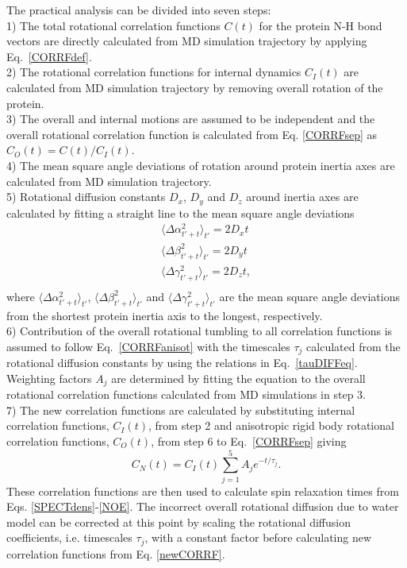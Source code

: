 \documentclass[journal=jpcbfk,manuscript=article]{achemso}
\begin{document}
The practical analysis can be divided into seven steps: \\
1) The total rotational correlation functions $C(t)$
for the protein N-H bond vectors are directly calculated from MD simulation trajectory
by applying Eq.~\ref{CORRFdef}. \\
2) The rotational correlation functions for internal
dynamics $C_I(t)$ are calculated from MD simulation trajectory
by removing overall rotation of the protein. \\
3) The overall and internal motions are assumed to be independent and the overall
rotational correlation function is calculated from Eq. \ref{CORRFsep} as $C_O(t)=C(t)/C_I(t)$. \\
4) The mean square angle deviations of rotation around protein inertia axes
are calculated from MD simulation trajectory. \\
5) Rotational diffusion constants $D_x$, $D_y$ and $D_z$ around inertia axes
are calculated by fitting a straight line to the mean square angle deviations 
\begin{equation}\label{DIFFdef}
  \begin{aligned}
    \langle \Delta \alpha_{t'+t}^2 \rangle_{t'} = 2 D_{x} t \\
    \langle \Delta \beta_{t'+t}^2 \rangle_{t'} = 2 D_{y} t \\
    \langle \Delta \gamma_{t'+t}^2 \rangle_{t'} = 2 D_{z} t, \\
  \end{aligned}
\end{equation}
where $\langle \Delta \alpha_{t'+t}^2 \rangle_{t'}$,
$\langle \Delta \beta_{t'+t}^2 \rangle_{t'}$ and
$\langle \Delta \gamma_{t'+t}^2 \rangle_{t'}$ are
the mean square angle deviations from the shortest protein
inertia axis to the longest, respectively.\\
6) Contribution of the overall rotational tumbling to all correlation
functions is assumed to follow Eq.~\ref{CORRFanisot} with the
timescales $\tau_j$ calculated from the rotational diffusion constants
by using the relations in Eq.~\ref{tauDIFFeq}.
Weighting factors $A_j$ are determined by fitting the equation %
to the overall rotational correlation functions calculated from MD simulations in step 3. \\
7) The new correlation functions are calculated by substituting
internal correlation functions, $C_I(t)$, from step 2 and anisotropic rigid body
rotational correlation functions, $C_O(t)$, from step 6 to
Eq.~\ref{CORRFsep} giving
\begin{equation}\label{newCORRF}
  C_N(t)=C_I(t)\sum_{j=1}^5 A_j e^{-t/\tau_j}.
\end{equation}
These correlation functions are then used to calculate spin relaxation times
from Eqs. \ref{SPECTdens}-\ref{NOE}. The incorrect overall rotational
diffusion due to water model can be corrected at this point  by scaling the rotational diffusion
coefficients, i.e. timescales $\tau_j$, with a constant factor before calculating
new correlation functions from Eq. \ref{newCORRF}.
\end{document}

